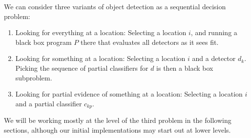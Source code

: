 We can consider three variants of object detection as a sequential decision problem:
\begin{enumerate}
  \item Looking for everything at a location: Selecting a location $i$, and running a black box program $P$ there that evaluates all detectors as it sees fit.
  \item Looking for something at a location: Selecting a location $i$ and a detector $d_k$. Picking the sequence of partial classifiers for $d$ is then a black box subproblem.
\item Looking for partial evidence of something at a location: Selecting a location $i$ and a partial classifier $c_{kp}$.
\end{enumerate}
We will be working mostly at the level of the third problem in the following sections, although our initial implementations may start out at lower levels.

